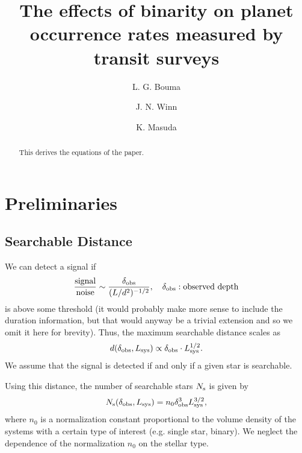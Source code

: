 \documentclass[12pt,modern]{aastex61}
\begin{document}
    
\title{ The effects of binarity on planet occurrence rates measured by transit 
surveys}
%
%
\author{L. G. Bouma}
\author{J. N. Winn}
\author{K. Masuda}
%
%
\begin{abstract}
%
This derives the equations of the paper.

%
\end{abstract}
%
%
%

\newcommand{\pt}{\theta}
\newcommand{\pa}{\theta_{\rm a}}
\newcommand{\pn}{\theta_0}

\newcommand{\pp}{\mathcal{P}}
\newcommand{\ps}{\mathcal{S}}
\renewcommand{\a}{_{\rm a}}
\newcommand{\s}{_{\rm s}}

\section{Preliminaries}

\subsection{Searchable Distance}

We can detect a signal if 
\begin{equation}
	{\text{signal}\over\text{noise}}\sim
    {\delta_{\rm obs}\over(L/d^2)^{-1/2}},
	\quad \delta_{\rm obs}:\text{observed depth}
\end{equation}
is above some threshold (it would probably make more sense to include the 
duration information, but that would anyway be a trivial extension and so we 
omit it here for brevity). Thus, the maximum searchable distance scales as
\begin{equation}
	d(\delta_{\rm obs}, L_{\rm sys}) \propto \delta_{\rm obs} \cdot L_{\rm 
	sys}^{1/2}.
\end{equation}
We assume that the signal is detected if and only if a given star is searchable. 

Using this distance, the number of searchable stars $N\s$ is given by
\begin{equation}
	N\s(\delta_{\rm obs}, L_{\rm sys})=n_0 \delta_{\rm obs}^3 L_{\rm 
	sys}^{3/2},
\end{equation}
where $n_0$ is a normalization constant proportional to the volume density of the systems with a certain type of interest (e.g. single star, binary).
We neglect the dependence of the normalization $n_0$ on the stellar type.
\end{document}
